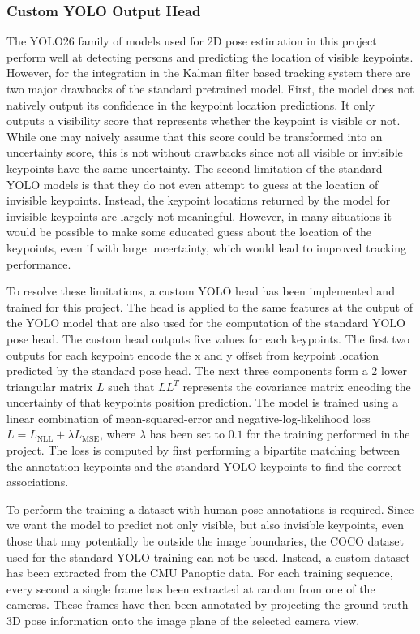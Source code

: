 \subsubsection{Custom YOLO Output Head} \label{yolo-head}

The YOLO26 family of models used for 2D pose estimation in this project perform well at detecting persons and predicting the location of visible keypoints. However, for the integration in the Kalman filter based tracking system there are two major drawbacks of the standard pretrained model. First, the model does not natively output its confidence in the keypoint location predictions. It only outputs a visibility score that represents whether the keypoint is visible or not. While one may naively assume that this score could be transformed into an uncertainty score, this is not without drawbacks since not all visible or invisible keypoints have the same uncertainty. The second limitation of the standard YOLO models is that they do not even attempt to guess at the location of invisible keypoints. Instead, the keypoint locations returned by the model for invisible keypoints are largely not meaningful. However, in many situations it would be possible to make some educated guess about the location of the keypoints, even if with large uncertainty, which would lead to improved tracking performance.

To resolve these limitations, a custom YOLO head has been implemented and trained for this project. The head is applied to the same features at the output of the YOLO model that are also used for the computation of the standard YOLO pose head. The custom head outputs five values for each keypoints. The first two outputs for each keypoint encode the x and y offset from keypoint location predicted by the standard pose head. The next three components form a 2 lower triangular matrix $L$ such that $LL^T$ represents the covariance matrix encoding the uncertainty of that keypoints position prediction. The model is trained using a linear combination of mean-squared-error and negative-log-likelihood loss $L = L_\mathrm{NLL} + \lambda L_\mathrm{MSE}$, where $\lambda$ has been set to $0.1$ for the training performed in the project. The loss is computed by first performing a bipartite matching between the annotation keypoints and the standard YOLO keypoints to find the correct associations.

To perform the training a dataset with human pose annotations is required. Since we want the model to predict not only visible, but also invisible keypoints, even those that may potentially be outside the image boundaries, the COCO dataset used for the standard YOLO training can not be used. Instead, a custom dataset has been extracted from the CMU Panoptic data. For each training sequence, every second a single frame has been extracted at random from one of the cameras. These frames have then been annotated by projecting the ground truth 3D pose information onto the image plane of the selected camera view.


